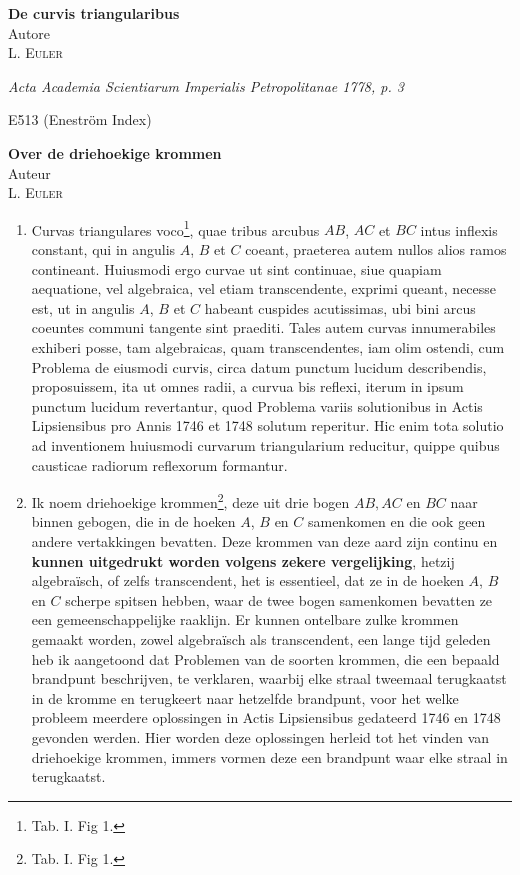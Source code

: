 \documentclass[10pt,a4paper]{article}
\newcommand{\switchenum}{\setcounter{enumi}{\arabic{enumi}-1}\switchcolumn}
\begin{document}
\begin{paracol}{2}
\begin{center}
		\par {\bf De curvis triangularibus}\\
		Autore\\
		\textsc{L. Euler}
	\end{center}
	\switchcolumn
	
	\par \textit{Acta Academia Scientiarum Imperialis Petropolitanae 1778, p. 3} 
	\par E513 (Eneström Index) 
	\begin{center}
		\par {}
		
		\par {\bf Over de driehoekige krommen}\\
		Auteur\\
		\textsc{L. Euler}
	\end{center}
	\switchcolumn*

	\par \begin{enumerate}[topsep=1px]
		\item Curvas triangulares voco\footnote{Tab. I. Fig 1.}, quae tribus arcubus $AB$, $AC$ et $BC$ intus inflexis constant, qui in angulis $A$, $B$ et $C$ coeant, praeterea autem nullos alios ramos contineant. Huiusmodi ergo curvae ut sint continuae, siue quapiam aequatione, vel algebraica, vel etiam transcendente, exprimi queant, necesse est, ut in angulis $A$, $B$ et $C$ habeant cuspides acutissimas, ubi bini arcus coeuntes communi tangente sint praediti. Tales autem curvas innumerabiles exhiberi posse, tam algebraicas, quam transcendentes, iam olim ostendi, cum Problema de eiusmodi curvis, circa datum punctum lucidum describendis, proposuissem, ita ut omnes radii, a curvua bis reflexi, iterum in ipsum punctum lucidum revertantur, quod Problema variis solutionibus in Actis Lipsiensibus pro Annis 1746 et 1748 solutum reperitur. Hic enim tota solutio ad inventionem huiusmodi curvarum triangularium reducitur, quippe quibus causticae radiorum reflexorum formantur. 
		
		\switchenum
		\item Ik noem driehoekige krommen\footnote{Tab. I. Fig 1.}, deze uit drie bogen $AB, AC$ en $BC$ naar binnen gebogen, die in de hoeken $A$, $B$ en $C$ samenkomen en die ook geen andere vertakkingen bevatten. Deze krommen van deze aard zijn continu en \textbf{kunnen uitgedrukt worden volgens zekere vergelijking}, hetzij algebraïsch, of zelfs transcendent, het is essentieel, dat ze in de hoeken $A$, $B$ en $C$ scherpe spitsen hebben, waar de twee bogen samenkomen bevatten ze een gemeenschappelijke raaklijn. Er kunnen ontelbare zulke krommen gemaakt worden, zowel algebraïsch als transcendent, een lange tijd geleden heb ik aangetoond dat Problemen van de soorten krommen, die een bepaald brandpunt beschrijven, te verklaren, waarbij elke straal tweemaal terugkaatst in de kromme en terugkeert naar hetzelfde brandpunt, voor het welke probleem meerdere oplossingen in Actis Lipsiensibus gedateerd 1746 en 1748 gevonden werden. Hier worden deze oplossingen herleid tot het vinden van driehoekige krommen, immers vormen deze een brandpunt waar elke straal in terugkaatst. 
		

\end{enumerate}
\end{paracol}
\end{document}
